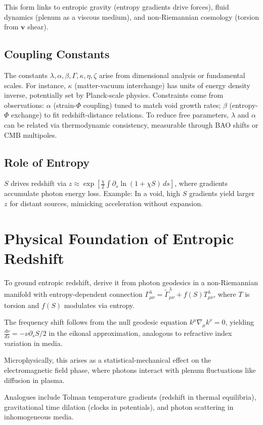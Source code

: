 \documentclass[11pt]{article}
\theoremstyle{plain}
\theoremstyle{definition}
\begin{document}
This form links to entropic gravity (entropy gradients drive forces), fluid dynamics (plenum as a viscous medium), and non-Riemannian cosmology (torsion from $\bm{v}$ shear).

\subsection{Coupling Constants}
The constants $\lambda, \alpha, \beta, \Gamma, \kappa, \eta, \zeta$ arise from dimensional analysis or fundamental scales. For instance, $\kappa$ (matter-vacuum interchange) has units of energy density inverse, potentially set by Planck-scale physics. Constraints come from observations: $\alpha$ (strain-$\Phi$ coupling) tuned to match void growth rates; $\beta$ (entropy-$\Phi$ exchange) to fit redshift-distance relations. To reduce free parameters, $\lambda$ and $\alpha$ can be related via thermodynamic consistency, measurable through BAO shifts or CMB multipoles.

\subsection{Role of Entropy}
$S$ drives redshift via $z \approx \exp\left[\frac{\chi}{2} \int \partial_s \ln(1 + \chi S) \, ds\right]$, where gradients accumulate photon energy loss. Example: In a void, high $S$ gradients yield larger $z$ for distant sources, mimicking acceleration without expansion.

\section{Physical Foundation of Entropic Redshift}
To ground entropic redshift, derive it from photon geodesics in a non-Riemannian manifold with entropy-dependent connection $\Gamma^\lambda_{\mu\nu} = \tilde{\Gamma}^\lambda_{\mu\nu} + f(S) T^\lambda_{\mu\nu}$, where $T$ is torsion and $f(S)$ modulates via entropy.

The frequency shift follows from the null geodesic equation $k^\mu \nabla_\mu k^\nu = 0$, yielding $\frac{d\nu}{ds} = -\nu \partial_s S / 2$ in the eikonal approximation, analogous to refractive index variation in media.

Microphysically, this arises as a statistical-mechanical effect on the electromagnetic field phase, where photons interact with plenum fluctuations like diffusion in plasma.

Analogues include Tolman temperature gradients (redshift in thermal equilibria), gravitational time dilation (clocks in potentials), and photon scattering in inhomogeneous media.
\end{document}
